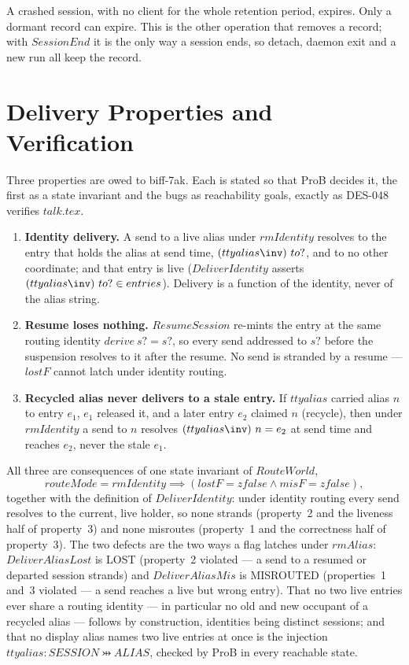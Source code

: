 \documentclass[a4paper,10pt,fleqn]{article}
\begin{document}
A crashed session, with no client for the whole retention period, expires.
Only a dormant record can expire.  This is the other operation that
removes a record; with $SessionEnd$ it is the only way a session ends, so
detach, daemon exit and a new run all keep the record.

\section{Delivery Properties and Verification}
\label{sec:delivery}

Three properties are owed to biff-7ak.  Each is stated so that ProB
decides it, the first as a state invariant and the bugs as reachability
goals, exactly as DES-048 verifies $talk.tex$.

\begin{enumerate}
\item \textbf{Identity delivery.}  A send to a live alias under
  $rmIdentity$ resolves to the entry that holds the alias at send time,
  $(ttyalias\inv)~to?$, and to no other coordinate; and that entry is
  live ($DeliverIdentity$ asserts $(ttyalias\inv)~to? \in entries$).
  Delivery is a function of the identity, never of the alias string.

\item \textbf{Resume loses nothing.}  $ResumeSession$ re-mints the entry
  at the same routing identity $derive~s? = s?$, so every send
  addressed to $s?$ before the suspension resolves to it after the
  resume.  No send is stranded by a resume --- $lostF$ cannot latch under
  identity routing.

\item \textbf{Recycled alias never delivers to a stale entry.}  If
  $ttyalias$ carried alias $n$ to entry $e_1$, $e_1$ released it, and a
  later entry $e_2$ claimed $n$ (recycle), then under $rmIdentity$ a send
  to $n$ resolves $(ttyalias\inv)~n = e_2$ at send time and reaches $e_2$,
  never the stale $e_1$.
\end{enumerate}

All three are consequences of one state invariant of $RouteWorld$,
$$routeMode = rmIdentity \implies (lostF = zfalse \land misF = zfalse),$$
together with the definition of $DeliverIdentity$: under identity routing
every send resolves to the current, live holder, so none strands
(property~2 and the liveness half of property~3) and none misroutes
(property~1 and the correctness half of property~3).  The two defects are
the two ways a flag latches under $rmAlias$: $DeliverAliasLost$ is LOST
(property~2 violated --- a send to a resumed or departed session strands)
and $DeliverAliasMis$ is MISROUTED (properties~1 and~3 violated --- a send
reaches a live but wrong entry).  That no two live entries ever share a
routing identity --- in particular no old and new occupant of a recycled
alias --- follows by construction, identities being distinct sessions; and that no display alias
names two live entries at once is the injection
$ttyalias : SESSION \pinj ALIAS$, checked by ProB in every
reachable state.
\end{document}
